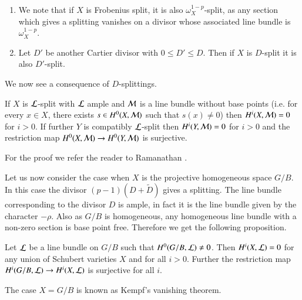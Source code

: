 \begin{remark}\label{rem-A.2.4}
\begin{enumerate}
\item We note that if $X$ is Frobenius split, it is also
  $\omega^{1-p}_{X}$-split, as any section which gives a splitting
  vanishes on a divisor whose associated line bundle is $\omega^{1-p}_{X}$.

\item Let $D'$ be another Cartier divisor with $0\leq D'\leq D$. Then
  if $X$ is $D$-split it is also $D'$-split.
\end{enumerate}
\end{remark}

We now see a consequence of $D$-splittings.

\begin{proposition}\label{prop-A.2.5}
If $X$ is $\mathcal{L}$-split with $\mathcal{L}$ ample and $\mathcal{M}$ is a line bundle without
base points (i.e. for every $x\in X$, there exists $s\in H^{0}(X,\mathcal{M})$
such that $s(x)\neq 0$) then $H^{i}(X,\mathcal{M})=0$ for $i>0$. If further $Y$
is compatibly $\mathcal{L}$-split then $H^{i}(Y,\mathcal{M})=0$ for $i>0$ and the
restriction map $H^{0}(X,\mathcal{M})\to H^{0}(Y,\mathcal{M})$ is surjective.
\end{proposition}

For the proof we refer the reader to Ramanathan \cite{key32}.

Let us now consider the case when $X$ is the projective homogeneous
space $G/B$. In this case the divisor $(p-1)(D+\tilde{D})$ gives a
splitting. The line bundle corresponding to the divisor $D$ is ample,
in fact it is the line bundle given by the character $-\rho$. Also as
$G/B$ is homogeneous, any homogeneous line bundle with a non-zero
section is base point free. Therefore we get the following
proposition.

\begin{proposition}\label{prop-A.2.6}
Let $\mathcal{L}$ be a line bundle on $G/B$ such that $H^{0}(G/B,\mathcal{L})\neq
0$. Then $H^{i}(X,\mathcal{L})=0$ for any union of Schubert varieties $X$ and
for all $i>0$. Further the restriction map $H^{i}(G/B,\mathcal{L})\to
H^{i}(X,\mathcal{L})$ is surjective for all $i$.
\end{proposition}

\begin{remark}\label{rem-A.2.7}
The case $X=G/B$ is known as Kempf's vanishing theorem. 
\end{remark}

